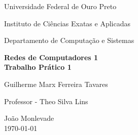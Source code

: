\documentclass[brazil, a4paper,12pt]{article}
\begin{document}
\begin{titlepage}

  \vfill

  \begin{center}
    \begin{large}
      Universidade Federal de Ouro Preto
    \end{large}
  \end{center}

  \begin{center}
    \begin{large}
      Instituto de Ciências Exatas e Aplicadas
    \end{large}
  \end{center}

  \begin{center}
    \begin{large}
      Departamento de Computação e Sistemas
    \end{large}
  \end{center}

  \vfill

  \begin{center}
    \begin{Large}
      \textbf{Redes de Computadores 1\\[0.4cm] 
        Trabalho Prático 1}               
    \end{Large}
  \end{center}


  \vfill

  \begin{center}
    \begin{large}
      Guilherme Marx Ferreira Tavares
    \end{large}
  \end{center}

  \begin{center}
    \begin{large}
      Professor - Theo Silva Lins
    \end{large}
  \end{center}

  \vfill

  \begin{center}
    \begin{large}
      João Monlevade \\
      \today \\
    \end{large}
  \end{center}

\end{titlepage}
\end{document}
